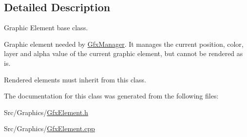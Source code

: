 \subsection{Detailed Description}
Graphic Element base class. 

Graphic element needed by \hyperlink{classGfxManager}{Gfx\-Manager}. It manages the current position, color, layer and alpha value of the current graphic element, but cannot be rendered as is.

Rendered elements must inherit from this class. 

The documentation for this class was generated from the following files\-:\begin{DoxyCompactItemize}
\item 
Src/\-Graphics/\hyperlink{GfxElement_8h}{Gfx\-Element.\-h}\item 
Src/\-Graphics/\hyperlink{GfxElement_8cpp}{Gfx\-Element.\-cpp}\end{DoxyCompactItemize}
